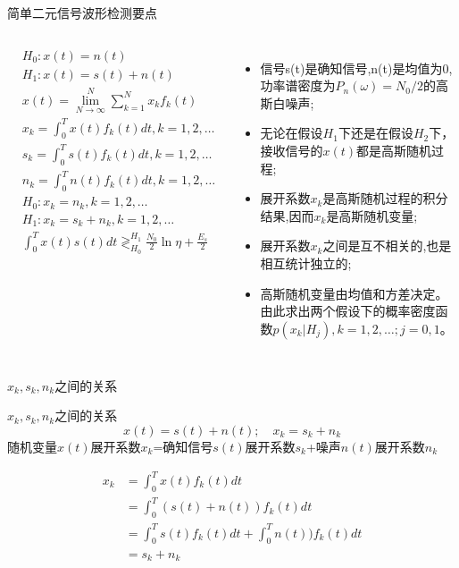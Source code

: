 \begin{frame}[shrink]{简单二元信号波形检测要点}
\begin{columns}
	\begin{align*}
	&H_0: x(t)=n(t)\\
	&H_1: x(t)=s(t)+n(t)\\
	&x(t)=\lim\limits_{N\to\infty}^N\sum\limits_{k=1}^Nx_kf_k(t)\\
	&x_k=\int_{0}^{T}x(t)f_k(t)dt, k=1,2,\dots\\
	&s_k=\int_{0}^{T}s(t)f_k(t)dt, k=1,2,\dots\\
	&n_k=\int_{0}^{T}n(t)f_k(t)dt, k=1,2,\dots\\
	&H_0: x_k=n_k,k=1,2,\dots\\
	&H_1: x_k=s_k+n_k,k=1,2,\dots\\
    &\int_{0}^{T}x(t)s(t)dt\mathop{\gtrless}_{H_0}^{H_1}\frac{N_0}{2}\ln\eta+\frac{E_s}{2}
	\end{align*}
	\begin{itemize}
		\setlength{\itemsep}{.4cm}
		\item 信号s(t)是确知信号,n(t)是均值为0,功率谱密度为$P_n(\omega)=N_0/2$的高斯白噪声;
		\item 无论在假设$H_1$下还是在假设$H_2$下，接收信号的$x(t)$都是高斯随机过程;
		\item 展开系数$x_k$是高斯随机过程的积分结果,因而$x_k$是高斯随机变量;
		\item 展开系数$x_k$之间是互不相关的,也是相互统计独立的;
		\item 高斯随机变量由均值和方差决定。由此求出两个假设下的概率密度函数$p(x_k|H_j),k=1,2,\dots;j=0,1$。
	\end{itemize}
\end{columns}
\vspace{0.2cm}
\end{frame}

\begin{frame}{$x_k,s_k,n_k$之间的关系}
\begin{block}{$x_k,s_k,n_k$之间的关系}
	\[x(t)=s(t)+n(t); \quad x_k=s_k+n_k \]
	随机变量$x(t)$展开系数$x_k$=确知信号$s(t)$展开系数$s_k$+噪声$n(t)$展开系数$n_k$
\end{block}
\begin{align*}
x_k&=\int_{0}^{T}x(t)f_k(t)dt\\
&=\int_{0}^{T}(s(t)+n(t))f_k(t)dt\\
&=\int_{0}^{T}s(t)f_k(t)dt+\int_{0}^{T}n(t))f_k(t)dt\\
&=s_k+n_k
\end{align*}
\end{frame}

